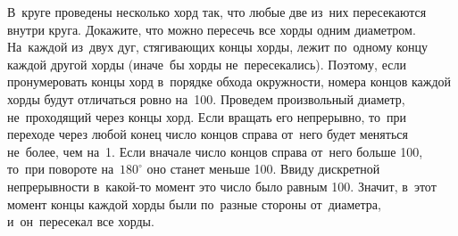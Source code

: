 \problem{}
В~круге проведены несколько хорд так, что любые две из~них пересекаются внутри
круга.
Докажите, что можно пересечь все хорды одним диаметром.
\solution
На~каждой из~двух дуг, стягивающих концы хорды, лежит по~одному концу каждой
другой хорды (иначе~бы хорды не~пересекались).
Поэтому, если пронумеровать концы хорд в~порядке обхода окружности, номера
концов каждой хорды будут отличаться ровно на~100.
Проведем произвольный диаметр, не~проходящий через концы хорд.
Если вращать его непрерывно, то~при переходе через любой конец число концов
справа от~него будет меняться не~более, чем на~1.
Если вначале число концов справа от~него больше 100, то~при повороте
на~$180^\circ$ оно станет меньше 100.
Ввиду дискретной непрерывности в~какой-то момент это число было равным 100.
Значит, в~этот момент концы каждой хорды были по~разные стороны от~диаметра,
и~он~пересекал все хорды.
\endproblem
